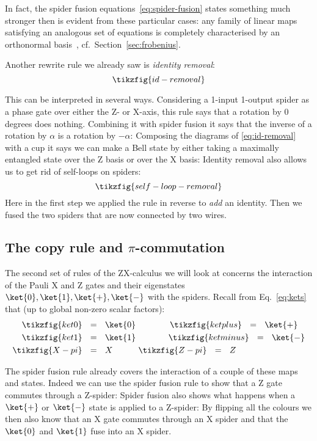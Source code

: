\documentclass[a4paper,onecolumn,superscriptaddress,11pt,%
				unpublished,%
				allowfontchageintitle,%
				]{quantumarticle}
\begin{document}
In fact, the spider fusion equations~\eqref{eq:spider-fusion} states something much stronger then is evident from these particular cases: any family of linear maps satisfying an analogous set of equations is completely characterised by an orthonormal basis~\cite{coecke2013new}, cf.~Section~\ref{sec:frobenius}.

Another rewrite rule we already saw is \emph{identity removal}:
\begin{equation}\label{eq:id-removal}
\tikzfig{id-removal}
\end{equation}

This can be interpreted in several ways. Considering a 1-input 1-output spider as a phase gate over either the Z- or X-axis, this rule says that a rotation by 0 degrees does nothing. Combining it with spider fusion it says that the inverse of a rotation by $\alpha$ is a rotation by $-\alpha$:
Composing the diagrams of \eqref{eq:id-removal} with a cup it says we can make a Bell state by either taking a maximally entangled state over the Z basis or over the X basis:
Identity removal also allows us to get rid of self-loops on spiders:
\begin{equation}\label{eq:self-loop-removal}
\tikzfig{self-loop-removal}
\end{equation}
Here in the first step we applied the rule in reverse to \emph{add} an identity. Then we fused the two spiders that are now connected by two wires.

\subsection{The copy rule and \texorpdfstring{$\pi$}{pi}-commutation}

The second set of rules of the ZX-calculus we will look at concerns the interaction of the Pauli X and Z gates and their eigenstates $\ket{0}, \ket{1}, \ket{+}, \ket{-}$ with the spiders. Recall from Eq.~\eqref{eq:kets} that (up to global non-zero scalar factors):
\begin{align*}
\tikzfig{ket0}\ \ &=\ \ \ket{0}
\qquad\qquad
\tikzfig{ketplus}\ \ =\ \ \ket{+} \\
\tikzfig{ket1}\ \ &=\ \ \ket{1}
\qquad\qquad\!
\tikzfig{ketminus}\ \ =\ \ \ket{-} \\
\tikzfig{X-pi} \ \ &=\ \ X 
\qquad \quad
\tikzfig{Z-pi} \ \ =\ \ Z
\end{align*}

The spider fusion rule already covers the interaction of a couple of these maps and states. Indeed we can use the spider fusion rule to show that a Z gate commutes through a Z-spider:
Spider fusion also shows what happens when a $\ket{+}$ or $\ket{-}$ state is applied to a Z-spider:
By flipping all the colours we then also know that an X gate commutes through an X spider and that the $\ket{0}$ and $\ket{1}$ fuse into an X spider.
\end{document}
